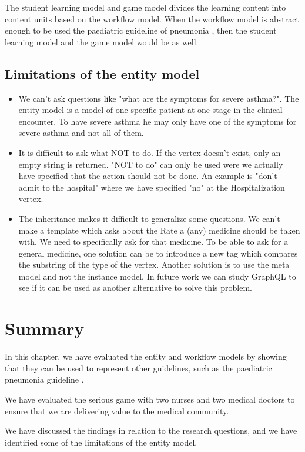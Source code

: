 The student learning model and game model divides the learning content into content units based on the workflow model. When the workflow model is abstract enough to be used the paediatric guideline of pneumonia \parencite{RepublicofKeny2016}, then the student learning model and the game model would be as well. 



\subsection{Limitations of the entity model}
\begin{itemize}
	\item We can't ask questions like "what are the symptoms for severe asthma?". The entity model is a model of one specific patient at one stage in the clinical encounter. To have severe asthma he may only have one of the symptoms for severe asthma and not all of them.
	\item It is difficult to ask what NOT to do. If the vertex doesn't exist, only an empty string is returned. "NOT to do" can only be used were we actually have specified that the action should not be done. An example is "don't admit to the hospital" where we have specified "no" at the Hospitalization vertex.
	\item The inheritance makes it difficult to generalize some questions. We can't make a template which asks about the Rate a (any) medicine should be taken with. We need to specifically ask for that medicine. To be able to ask for a general medicine, one solution can be to introduce a new tag which compares the substring of the type of the vertex. Another solution is to use the meta model and not the instance model. In future work we can study GraphQL to see if it can be used as another alternative to solve this problem.
\end{itemize}

\section{Summary}
In this chapter, we have evaluated the  entity and workflow models by showing that they can be used to represent other guidelines, such as the paediatric pneumonia guideline \parencite{RepublicofKeny2016}.

We have evaluated the serious game with two nurses and two medical doctors to ensure that we are delivering value to the medical community.

We have discussed the findings in relation to the research questions, and we have identified some of the limitations of the entity model.  
	


